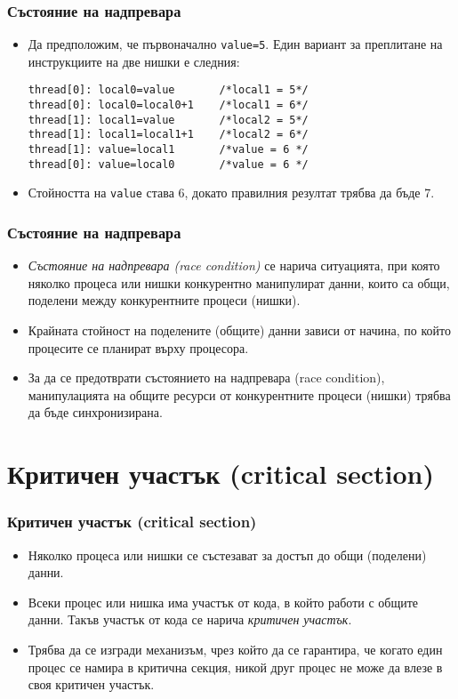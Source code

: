 \documentclass[ignorenonframetext, hyperref=unicode,compress]{beamer}
\begin{document}
\begin{frame}[containsverbatim]
\frametitle{Състояние на надпревара}
\begin{itemize}
\item Да предположим, че първоначално \lstinline{value=5}. Един вариант за
преплитане на инструкциите на две нишки е следния:
\begin{lstlisting}
thread[0]: local0=value       /*local1 = 5*/
thread[0]: local0=local0+1    /*local1 = 6*/
thread[1]: local1=value       /*local2 = 5*/
thread[1]: local1=local1+1    /*local2 = 6*/
thread[1]: value=local1       /*value = 6 */
thread[0]: value=local0       /*value = 6 */
\end{lstlisting}
\item Стойността на \lstinline{value} става 6, докато правилния
резултат трябва да бъде 7.
\end{itemize}
\end{frame}

\begin{frame}[containsverbatim]
\frametitle{Състояние на надпревара}
\begin{itemize}
  \item {\em Състояние на надпревара (race condition)} се нарича ситуацията, при която
  няколко
  процеса или нишки конкурентно манипулират данни, които са общи, поделени между
  конкурентните процеси (нишки).
  \item Крайната стойност на поделените (общите) данни зависи от начина, по
  който процесите се планират върху процесора.
  \item За да се предотврати състоянието на надпревара (race condition),
  манипулацията на общите ресурси от конкурентните процеси (нишки) трябва да
  бъде синхронизирана.
\end{itemize}
\end{frame}

\section{Критичен участък (critical section)}

\begin{frame}[containsverbatim]
\frametitle{Критичен участък (critical section)}
\begin{itemize}
  \item Няколко процеса или нишки се състезават за достъп до общи (поделени)
  данни.
  \item Всеки процес или нишка има участък от кода, в който работи с общите
  данни. Такъв участък от кода се нарича {\em критичен участък}. 
  \item Трябва да се изгради механизъм, чрез който да се гарантира, че когато
  един процес се намира в критична секция, никой друг процес не може да
  влезе в своя критичен участък.
\end{itemize}
\end{frame}
\end{document}
